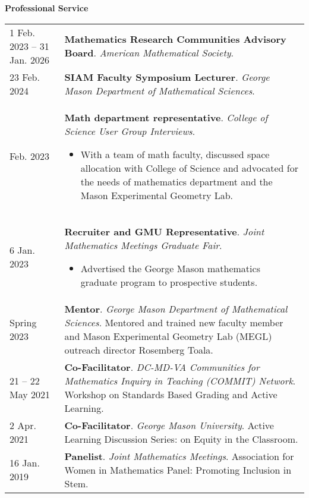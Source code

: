     \textbf{\large Professional Service}
    
    \begin{center}
    {
    \renewcommand{\arraystretch}{1.2}
    \begin{longtable}{p{}  p{}}
    1 Feb.  2023 -- 31 Jan.  2026 & \textbf{Mathematics Research Communities Advisory Board}. \textit{American Mathematical Society}.  \\ 
23 Feb.  2024 & \textbf{SIAM Faculty Symposium Lecturer}. \textit{George Mason Department of Mathematical Sciences}.  \\ 
 Feb.  2023 & \textbf{Math department representative}. \textit{College of Science User Group Interviews}. 
        \hspace{-1em}

        {\small
        \begin{itemize}
        \setlength{\parindent}{0em}
        \item[] With a team of math faculty, discussed space allocation with College of Science and advocated for the needs of mathematics department and the Mason Experimental Geometry Lab.
        \end{itemize}
        }
        \vspace{-1em}
         \\ 
6 Jan.  2023 & \textbf{Recruiter and GMU Representative}. \textit{Joint Mathematics Meetings Graduate Fair}. 
        \hspace{-1em}

        {\small
        \begin{itemize}
        \setlength{\parindent}{0em}
        \item[] Advertised the George Mason mathematics graduate program to prospective students.
        \end{itemize}
        }
        \vspace{-1em}
         \\ 
  Spring 2023 & \textbf{Mentor}. \textit{George Mason Department of Mathematical Sciences}.  Mentored and trained new faculty member and Mason Experimental Geometry Lab (MEGL) outreach director Rosemberg Toala.  \\ 
21  -- 22 May  2021 & \textbf{Co-Facilitator}. \textit{DC-MD-VA Communities for Mathematics Inquiry in Teaching (COMMIT) Network}.  Workshop on Standards Based Grading and Active Learning.  \\ 
2 Apr.  2021 & \textbf{Co-Facilitator}. \textit{George Mason University}.  Active Learning Discussion Series: on Equity in the Classroom.  \\ 
16 Jan.  2019 & \textbf{Panelist}. \textit{Joint Mathematics Meetings}.  Association for Women in Mathematics Panel: Promoting Inclusion in Stem.  
    \end{longtable}
    } 
    \end{center}


